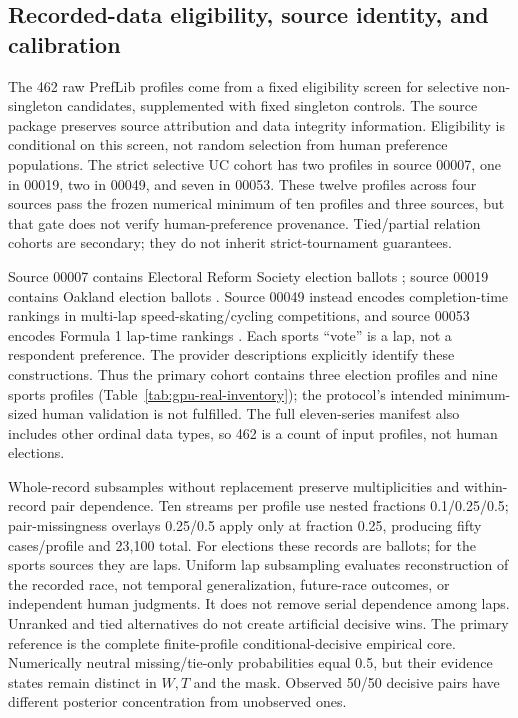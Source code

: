 \subsection{Recorded-data eligibility, source identity, and calibration}\label{app:gpu-real-inventory}
The 462 raw PrefLib profiles come from a fixed eligibility screen for selective non-singleton candidates, supplemented with fixed singleton controls. The source package preserves source attribution and data integrity information. Eligibility is conditional on this screen, not random selection from human preference populations. The strict selective UC cohort has two profiles in source 00007, one in 00019, two in 00049, and seven in 00053. These twelve profiles across four sources pass the frozen numerical minimum of ten profiles and three sources, but that gate does not verify human-preference provenance. Tied/partial relation cohorts are secondary; they do not inherit strict-tournament guarantees.

Source 00007 contains Electoral Reform Society election ballots \citep{preflibers}; source 00019 contains Oakland election ballots \citep{oneill2013openstv}. Source 00049 instead encodes completion-time rankings in multi-lap speed-skating/cycling competitions, and source 00053 encodes Formula 1 lap-time rankings \citep{boehmer2022collecting}. Each sports ``vote'' is a lap, not a respondent preference. The provider descriptions explicitly identify these constructions. Thus the primary cohort contains three election profiles and nine sports profiles (Table~\ref{tab:gpu-real-inventory}); the protocol's intended minimum-sized human validation is not fulfilled. The full eleven-series manifest also includes other ordinal data types, so 462 is a count of input profiles, not human elections.

\begin{table}[ht]\centering\small

\caption{Every primary strict selective UC profile. ``Records'' is the raw PrefLib multiplicity total, called ``voters'' by its generic format; its meaning is ballots or laps according to source. Complete pair coverage concerns the aggregate decisive matrix, not whether every individual order is complete.}
\label{tab:gpu-real-inventory}\end{table}

Whole-record subsamples without replacement preserve multiplicities and within-record pair dependence. Ten streams per profile use nested fractions 0.1/0.25/0.5; pair-missingness overlays 0.25/0.5 apply only at fraction 0.25, producing fifty cases/profile and 23,100 total. For elections these records are ballots; for the sports sources they are laps. Uniform lap subsampling evaluates reconstruction of the recorded race, not temporal generalization, future-race outcomes, or independent human judgments. It does not remove serial dependence among laps. Unranked and tied alternatives do not create artificial decisive wins. The primary reference is the complete finite-profile conditional-decisive empirical core. Numerically neutral missing/tie-only probabilities equal 0.5, but their evidence states remain distinct in $W,T$ and the mask. Observed 50/50 decisive pairs have different posterior concentration from unobserved ones.

